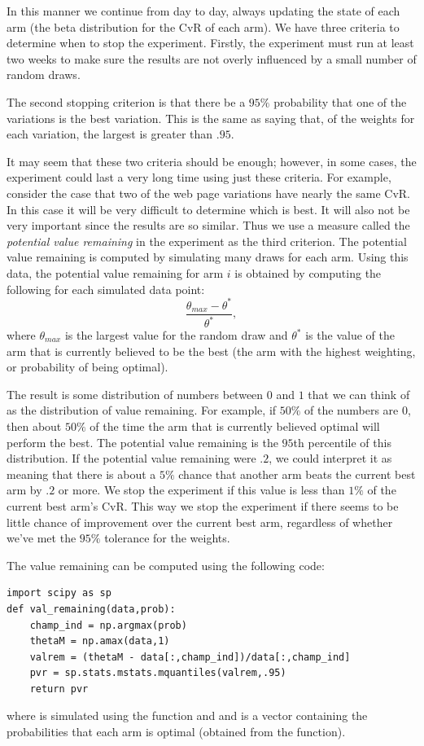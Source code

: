 In this manner we continue from day to day, always updating the state of each arm
(the beta distribution for the CvR of each arm).  We have three criteria to determine
when to stop the experiment.
Firstly, the experiment must run at least two weeks to make sure the
results are not overly influenced by a small number of random draws.

The second stopping criterion is that there be a $95\%$ probability that one
of the variations is the best variation.
This is the same as saying that, of the weights for each variation, the largest
is greater than $.95$.

It may seem that these two criteria should be enough; however, in some cases, the
experiment could last a very long time using just these criteria.
For example, consider the case that two of the web page variations have nearly the same CvR.
In this case it will be very difficult to determine which is best.
It will also not be very important since the results are so similar.
Thus we use a measure called the \emph{potential value remaining}
in the experiment as the third criterion.  The potential value remaining is computed by
simulating many draws for each arm.  Using this data, the potential value remaining
for arm $i$ is obtained by computing the following for each simulated data point:
\begin{equation}\label{valrem}
\frac{\theta_{max} - \theta^*}{\theta^*},
\end{equation}
where $\theta_{max}$ is the largest value for the random draw and $\theta^*$ is the
value of the arm that is currently believed to be the best
(the arm with the highest weighting, or probability of being optimal).

The result is some distribution of numbers between $0$ and $1$ that we can think
of as the distribution of value remaining.  For example, if $50\%$ of the numbers are 0,
then about $50\%$ of the time the arm that is currently believed optimal will perform the best.
The potential value remaining is the $95$th percentile of this distribution.
If the potential value remaining were $.2$, we could interpret it as meaning
that there is about a $5\%$ chance that another arm beats the current best arm by $.2$ or more.
We stop the experiment if this value is less than $1\%$ of the current best arm's CvR.
This way we stop the experiment if there seems to be little chance of improvement over
the current best arm, regardless of whether we've met the $95\%$ tolerance for the weights.

The value remaining can be computed using the following code:
\begin{lstlisting}
import scipy as sp
def val_remaining(data,prob):
    champ_ind = np.argmax(prob)
    thetaM = np.amax(data,1)
    valrem = (thetaM - data[:,champ_ind])/data[:,champ_ind]
    pvr = sp.stats.mstats.mquantiles(valrem,.95)
    return pvr
\end{lstlisting}
where  is simulated using the  function and
and  is a vector containing the probabilities that each arm is optimal
(obtained from the  function).

